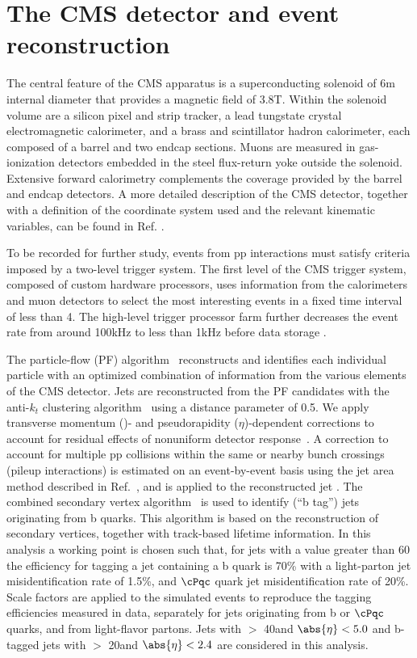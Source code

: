 \section{The CMS detector and event reconstruction}
\label{sect:CMSRec} 
The central feature of the CMS apparatus is a superconducting solenoid of 6\unit{m} 
internal diameter that provides a magnetic field of 3.8\unit{T}. Within the solenoid 
volume are a silicon pixel and strip tracker, a lead tungstate crystal electromagnetic 
calorimeter, and a brass and scintillator hadron calorimeter, each composed of a barrel 
and two endcap sections. Muons are measured in gas-ionization detectors embedded in the 
steel flux-return yoke outside the solenoid. Extensive forward calorimetry complements the coverage provided by the barrel and endcap detectors. 
A more detailed description of the CMS detector, together with a definition of the coordinate system used 
and the relevant kinematic variables, can be found in Ref. \cite{Chatrchyan:2008zzk}.

To be recorded for further study, events from pp interactions must satisfy criteria imposed by a two-level trigger system.
The first level of the CMS trigger system, composed of custom hardware processors, uses information from the 
calorimeters and muon detectors to select the most interesting events in a fixed time interval of less than 4\mus. 
The high-level trigger processor farm further decreases the event rate from around 100\unit{kHz} to less than 1\unit{kHz} 
before data storage \cite{Khachatryan:2016bia}.

The particle-flow (PF) algorithm~\cite{CMS-PAS-PFT-09-001,CMS-PAS-PFT-10-001} reconstructs and identifies each 
individual particle with an optimized combination of information from the various elements of the CMS detector. 
Jets are reconstructed from the PF candidates with the anti-$k_t$ clustering
algorithm~\cite{Cacciari:2008gp} using a distance parameter of 0.5. We apply 
transverse momentum (\pt)- and pseudorapidity ($\eta$)-dependent corrections to account for residual
effects of nonuniform detector response~\cite{Chatrchyan:2011ds}.
A correction to account for multiple pp collisions within the same or nearby
bunch crossings (pileup interactions) is estimated on an event-by-event basis using the
jet area method described in Ref.~\cite{Cacciari:2007fd}, and is
applied to the reconstructed jet \pt.
The combined secondary vertex algorithm~\cite{Chatrchyan:2012jua} is used to identify (``b tag'') jets 
originating from b quarks.  This algorithm  is based on the reconstruction of secondary vertices, together with track-based lifetime information. 
In this analysis a working point is chosen such that, for jets with a \PT value greater than 60\GeV 
the efficiency for tagging a jet containing a b quark is 70\% with a light-parton jet misidentification rate of 1.5\%, 
and $\cPqc$ quark jet misidentification rate of 20\%.
Scale factors are applied to the simulated events to reproduce the tagging efficiencies measured in data, 
separately for jets originating from b or $\cPqc$ quarks, and from light-flavor partons.
Jets with  \PT $>$ 40\GeV and $\abs{\eta} < 5.0$ and b-tagged jets with \PT $>$ 20\GeV and $\abs{\eta} < 2.4$ are considered in this analysis.

